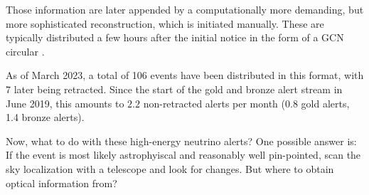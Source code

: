 Those information are later appended by a computationally more demanding, but more sophisticated reconstruction, which is initiated manually. These are typically distributed a few hours after the initial notice in the form of a GCN circular \cite{Tung2019}.

As of March 2023, a total of 106 events have been distributed in this format, with 7 later being retracted. Since the start of the gold and bronze alert stream in June 2019, this amounts to $2.2$ non-retracted alerts per month (0.8 gold alerts, 1.4 bronze alerts).

Now, what to do with these high-energy neutrino alerts? One possible answer is: If the event is most likely astrophyiscal and reasonably well pin-pointed, scan the sky localization with a telescope and look for changes. But where to obtain optical information from?

